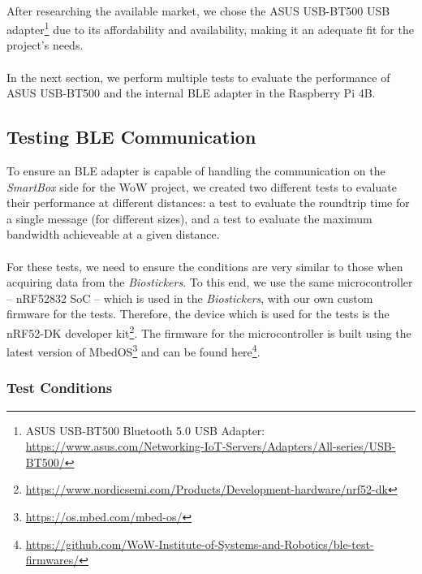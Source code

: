 \paragraph{} After researching the available market, we chose the ASUS USB-BT500 USB adapter\footnote{ASUS USB-BT500 Bluetooth 5.0 USB Adapter: \url{https://www.asus.com/Networking-IoT-Servers/Adapters/All-series/USB-BT500/}} due to its affordability and availability, making it an adequate fit for the project's needs.

\paragraph{} In the next section, we perform multiple tests to evaluate the performance of ASUS USB-BT500 and the internal \acs{BLE} adapter in the Raspberry Pi 4B.

\subsection{Testing \acs{BLE} Communication} 

To ensure an \acs{BLE} adapter is capable of handling the communication on the \textit{SmartBox} side for the \acs{WoW} project, we created two different tests to evaluate their performance at different distances: a test to evaluate the roundtrip time for a single message (for different sizes), and a test to evaluate the maximum bandwidth achieveable at a given distance.

\paragraph{} For these tests, we need to ensure the conditions are very similar to those when acquiring data from the \textit{Biostickers}. To this end, we use the same microcontroller -- nRF52832 \acs{SoC} -- which is used in the \textit{Biostickers}, with our own custom firmware for the tests. Therefore, the device which is used for the tests is the nRF52-DK developer kit\footnote{\url{https://www.nordicsemi.com/Products/Development-hardware/nrf52-dk}}. The firmware for the microcontroller is built using the latest version of MbedOS\footnote{\url{https://os.mbed.com/mbed-os/}} and can be found here\footnote{\url{https://github.com/WoW-Institute-of-Systems-and-Robotics/ble-test-firmwares/}}.

\subsubsection{Test Conditions}

